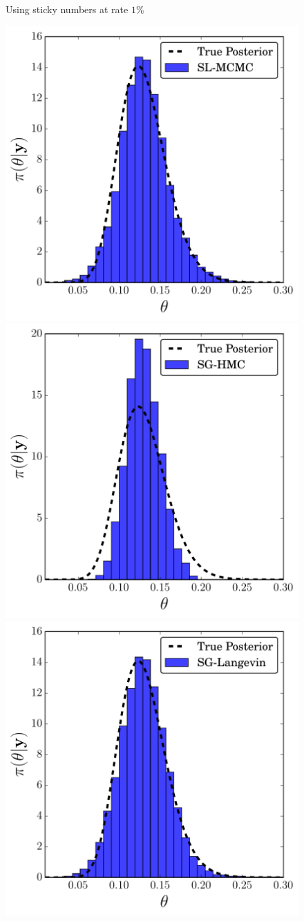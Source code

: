 \documentclass[]{article}
\begin{document}
\begin{figure}[t]
\begin{center}
\caption{\small{Using sticky numbers at rate $1\%$}}
\label{fig:exp-posteriors}
\end{center}
\vskip -0.2in
\end{figure} 

\begin{figure}[t]
\vskip 0.2in
\begin{center}
\includegraphics[width=0.45\columnwidth]{./images/exp-SL-MCMC-posterior-hist-omega-rate-100p0-chain0.pdf}
\includegraphics[width=0.45\columnwidth]{./images/exp-SG-HMC-posterior-hist-omega-rate-100p0-chain0.pdf}
\includegraphics[width=0.45\columnwidth]{./images/exp-SG-Langevin-posterior-hist-omega-rate-100p0-chain0.pdf}

\end{center}
\end{figure}
\end{document}
